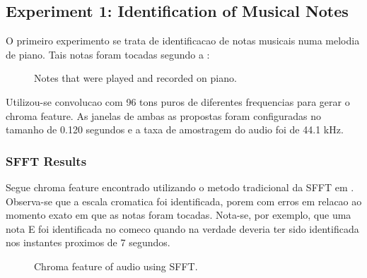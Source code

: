 \documentclass{article}
\begin{document}
	\subsection{Experiment 1: Identification of Musical Notes}

	O primeiro experimento se trata de identificacao de notas musicais numa melodia de piano. Tais notas foram tocadas segundo a : 

	\begin{figure}[h]
	 \centerline{}
	 \caption{Notes that were played and recorded on piano.}
	 \label{fig:1-notes}
	\end{figure}

	Utilizou-se convolucao com 96 tons puros de diferentes frequencias para gerar o chroma feature. As janelas de ambas as propostas foram configuradas no tamanho de 0.120 segundos e a taxa de amostragem do audio foi de 44.1 kHz.

	\subsubsection{SFFT Results}
	Segue chroma feature encontrado utilizando o metodo tradicional da SFFT em . Observa-se que a escala cromatica foi identificada, porem com erros em relacao ao momento exato em que as notas foram tocadas. Nota-se, por exemplo, que uma nota E foi identificada no comeco quando na verdade deveria ter sido identificada nos instantes proximos de 7 segundos.

	
	\begin{figure}[h]
	 \centerline{}
	 \caption{Chroma feature of audio using SFFT.}
	 \label{fig:1-ssft}
	\end{figure}	
\end{document}
